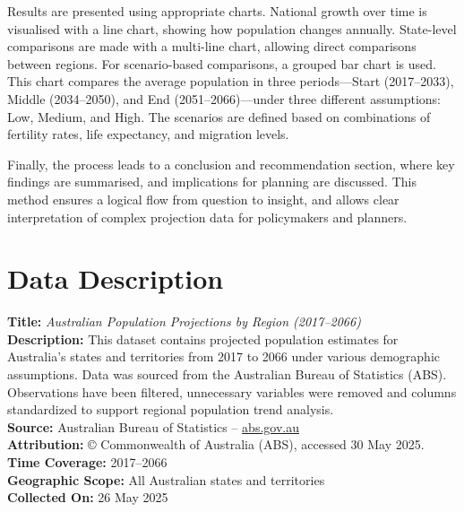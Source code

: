 \documentclass[
  11pt,
]{article}
\begin{document}
Results are presented using appropriate charts. National growth over
time is visualised with a line chart, showing how population changes
annually. State-level comparisons are made with a multi-line chart,
allowing direct comparisons between regions. For scenario-based
comparisons, a grouped bar chart is used. This chart compares the
average population in three periods---Start (2017--2033), Middle
(2034--2050), and End (2051--2066)---under three different assumptions:
Low, Medium, and High. The scenarios are defined based on combinations
of fertility rates, life expectancy, and migration levels.

Finally, the process leads to a conclusion and recommendation section,
where key findings are summarised, and implications for planning are
discussed. This method ensures a logical flow from question to insight,
and allows clear interpretation of complex projection data for
policymakers and planners.

\section{Data Description}\label{data-description}

\begin{tcolorbox}[enhanced jigsaw, leftrule=.75mm, title=\textcolor{quarto-callout-note-color}{\faInfo}\hspace{0.5em}{Meta Data}, colbacktitle=quarto-callout-note-color!10!white, colback=white, coltitle=black, opacitybacktitle=0.6, bottomtitle=1mm, rightrule=.15mm, breakable, bottomrule=.15mm, arc=.35mm, colframe=quarto-callout-note-color-frame, toptitle=1mm, toprule=.15mm, titlerule=0mm, left=2mm, opacityback=0]

\textbf{Title:} \emph{Australian Population Projections by Region
(2017--2066)}\\
\textbf{Description:} This dataset contains projected population
estimates for Australia's states and territories from 2017 to 2066 under
various demographic assumptions. Data was sourced from the Australian
Bureau of Statistics (ABS). Observations have been filtered, unnecessary
variables were removed and columns standardized to support regional
population trend analysis.\\
\textbf{Source:} Australian Bureau of Statistics --
\href{https://www.abs.gov.au}{abs.gov.au}\\
\textbf{Attribution:} © Commonwealth of Australia (ABS), accessed 30 May
2025.\\
\textbf{Time Coverage:} 2017--2066\\
\textbf{Geographic Scope:} All Australian states and territories\\
\textbf{Collected On:} 26 May 2025

\end{tcolorbox}
\end{document}
